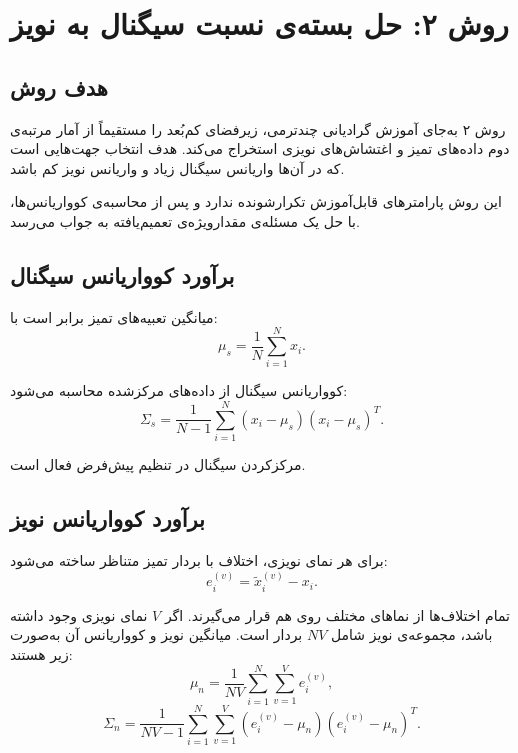 \documentclass[a4paper,12pt]{article}
\newcommand{\NPtwo}{\lr{NoiseProj2}}
\begin{document}
\section{روش ۲: حل بسته‌ی نسبت سیگنال به نویز \NPtwo{}}

\subsection{هدف روش}

روش ۲ به‌جای آموزش گرادیانی چندترمی، زیرفضای کم‌بُعد را مستقیماً از آمار مرتبه‌ی دوم داده‌های تمیز و اغتشاش‌های نویزی استخراج می‌کند. هدف انتخاب جهت‌هایی است که در آن‌ها واریانس سیگنال زیاد و واریانس نویز کم باشد.

این روش پارامترهای قابل‌آموزش تکرارشونده ندارد و پس از محاسبه‌ی کوواریانس‌ها، با حل یک مسئله‌ی مقدارویژه‌ی تعمیم‌یافته به جواب می‌رسد.

\subsection{برآورد کوواریانس سیگنال}

میانگین تعبیه‌های تمیز برابر است با:
\begin{equation}
 \mu_s=\frac{1}{N}\sum_{i=1}^{N}x_i.
\end{equation}

کوواریانس سیگنال از داده‌های مرکز‌شده محاسبه می‌شود:
\begin{equation}
 \Sigma_s
 =
 \frac{1}{N-1}
 \sum_{i=1}^{N}
 (x_i-\mu_s)(x_i-\mu_s)^{T}.
\end{equation}

مرکزکردن سیگنال در تنظیم پیش‌فرض فعال است.

\subsection{برآورد کوواریانس نویز}

برای هر نمای نویزی، اختلاف با بردار تمیز متناظر ساخته می‌شود:
\begin{equation}
 e_i^{(v)}=\tilde{x}_i^{(v)}-x_i.
\end{equation}

تمام اختلاف‌ها از نماهای مختلف روی هم قرار می‌گیرند. اگر $V$ نمای نویزی وجود داشته باشد، مجموعه‌ی نویز شامل $NV$ بردار است. میانگین نویز و کوواریانس آن به‌صورت زیر هستند:
\begin{equation}
 \mu_n
 =
 \frac{1}{NV}
 \sum_{i=1}^{N}\sum_{v=1}^{V}e_i^{(v)},
\end{equation}
\begin{equation}
 \Sigma_n
 =
 \frac{1}{NV-1}
 \sum_{i=1}^{N}\sum_{v=1}^{V}
 \left(e_i^{(v)}-\mu_n\right)
 \left(e_i^{(v)}-\mu_n\right)^{T}.
\end{equation}
\end{document}
